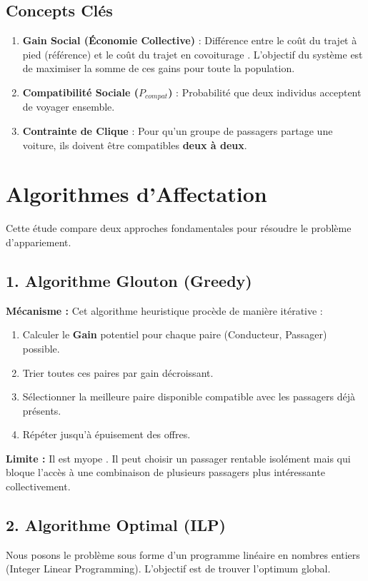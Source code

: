 \documentclass[a4paper,12pt]{article}
\begin{document}
\subsection{Concepts Clés}
\begin{enumerate}
    \item \textbf{Gain Social (Économie Collective)} : Différence entre le coût du trajet \og à pied \fg{} (référence) et le coût du trajet en \og covoiturage \fg{}. L'objectif du système est de maximiser la somme de ces gains pour toute la population.
    \item \textbf{Compatibilité Sociale ($P_{compat}$)} : Probabilité que deux individus acceptent de voyager ensemble.
    \item \textbf{Contrainte de Clique} : Pour qu'un groupe de passagers partage une voiture, ils doivent être compatibles \textbf{deux à deux}.
\end{enumerate}

\section{Algorithmes d'Affectation}

Cette étude compare deux approches fondamentales pour résoudre le problème d'appariement.

\subsection{1. Algorithme Glouton (Greedy)}
\textbf{Mécanisme :}
Cet algorithme heuristique procède de manière itérative :
\begin{enumerate}
    \item Calculer le \textbf{Gain} potentiel pour chaque paire (Conducteur, Passager) possible.
    \item Trier toutes ces paires par gain décroissant.
    \item Sélectionner la meilleure paire disponible compatible avec les passagers déjà présents.
    \item Répéter jusqu'à épuisement des offres.
\end{enumerate}
\textbf{Limite :} Il est \og myope \fg{}. Il peut choisir un passager rentable isolément mais qui bloque l'accès à une combinaison de plusieurs passagers plus intéressante collectivement.

\subsection{2. Algorithme Optimal (ILP)}
Nous posons le problème sous forme d'un programme linéaire en nombres entiers (Integer Linear Programming). L'objectif est de trouver l'optimum global.
\end{document}
